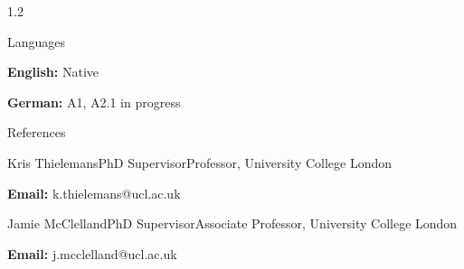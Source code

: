 \documentclass{cv}
\begin{document}
\begin{spacing}{1.2}
        \begin{rSection}{Languages}
            \item \begin{itemize*}[itemjoin={\hspace{1cm}|\hspace{1cm}}]
                \item \textbf{English:} Native
                \item \textbf{German:} A1, A2.1 in progress
            \end{itemize*} 
        \end{rSection}
    
        \begin{rSection}{References}
            \item \noindent \begin{minipage}[t]{0.36\textwidth}
                \begin{rSubsection}{Kris Thielemans}{PhD Supervisor}{Professor, University College London}{}
                    \item \textbf{Email:} k.thielemans@ucl.ac.uk
                \end{rSubsection}
            \end{minipage}
            \begin{minipage}[t]{0.45\textwidth}
                \begin{rSubsection}{Jamie McClelland}{PhD Supervisor}{Associate Professor, University College London}{}
                    \item \textbf{Email:} j.mcclelland@ucl.ac.uk
                \end{rSubsection}
            \end{minipage}
            \hfill
        \end{rSection}
    \end{spacing}

    \newpage
\end{document}
